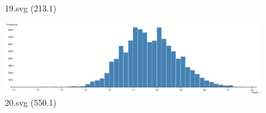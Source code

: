 \documentclass[journal]{IEEEtran}
\begin{document}
\begin{figure}[!htbp]
\begin{minipage}{0.233\columnwidth}
{19.svg (213.1)}
\end{minipage}
\hfill
\begin{minipage}{0.233\columnwidth}
\centering
\includegraphics[width=\textwidth]{Test_set/20.pdf}
{20.svg (550.1)}
\end{minipage}
\end{figure}
\end{document}
